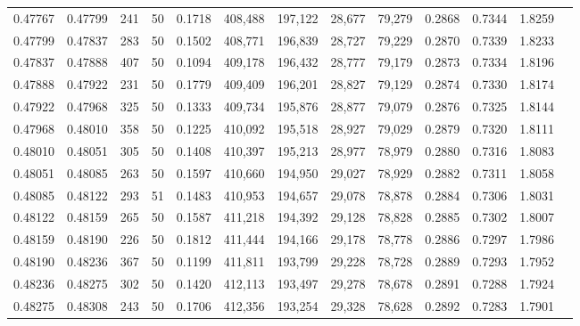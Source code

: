 \begin{tabular}{rrrrrrrrrrrrr}
0.47767 & 0.47799 &   241 &  50 &                                     0.1718 & 408,488 & 197,122 &  28,677 &  79,279 & 0.2868 & 0.7344 & 1.8259 \\
0.47799 & 0.47837 &   283 &  50 &                                     0.1502 & 408,771 & 196,839 &  28,727 &  79,229 & 0.2870 & 0.7339 & 1.8233 \\
0.47837 & 0.47888 &   407 &  50 &                                     0.1094 & 409,178 & 196,432 &  28,777 &  79,179 & 0.2873 & 0.7334 & 1.8196 \\
0.47888 & 0.47922 &   231 &  50 &                                     0.1779 & 409,409 & 196,201 &  28,827 &  79,129 & 0.2874 & 0.7330 & 1.8174 \\
0.47922 & 0.47968 &   325 &  50 &                                     0.1333 & 409,734 & 195,876 &  28,877 &  79,079 & 0.2876 & 0.7325 & 1.8144 \\
0.47968 & 0.48010 &   358 &  50 &                                     0.1225 & 410,092 & 195,518 &  28,927 &  79,029 & 0.2879 & 0.7320 & 1.8111 \\
0.48010 & 0.48051 &   305 &  50 &                                     0.1408 & 410,397 & 195,213 &  28,977 &  78,979 & 0.2880 & 0.7316 & 1.8083 \\
0.48051 & 0.48085 &   263 &  50 &                                     0.1597 & 410,660 & 194,950 &  29,027 &  78,929 & 0.2882 & 0.7311 & 1.8058 \\
0.48085 & 0.48122 &   293 &  51 &                                     0.1483 & 410,953 & 194,657 &  29,078 &  78,878 & 0.2884 & 0.7306 & 1.8031 \\
0.48122 & 0.48159 &   265 &  50 &                                     0.1587 & 411,218 & 194,392 &  29,128 &  78,828 & 0.2885 & 0.7302 & 1.8007 \\
0.48159 & 0.48190 &   226 &  50 &                                     0.1812 & 411,444 & 194,166 &  29,178 &  78,778 & 0.2886 & 0.7297 & 1.7986 \\
0.48190 & 0.48236 &   367 &  50 &                                     0.1199 & 411,811 & 193,799 &  29,228 &  78,728 & 0.2889 & 0.7293 & 1.7952 \\
0.48236 & 0.48275 &   302 &  50 &                                     0.1420 & 412,113 & 193,497 &  29,278 &  78,678 & 0.2891 & 0.7288 & 1.7924 \\
0.48275 & 0.48308 &   243 &  50 &                                     0.1706 & 412,356 & 193,254 &  29,328 &  78,628 & 0.2892 & 0.7283 & 1.7901 \\

\end{tabular}

